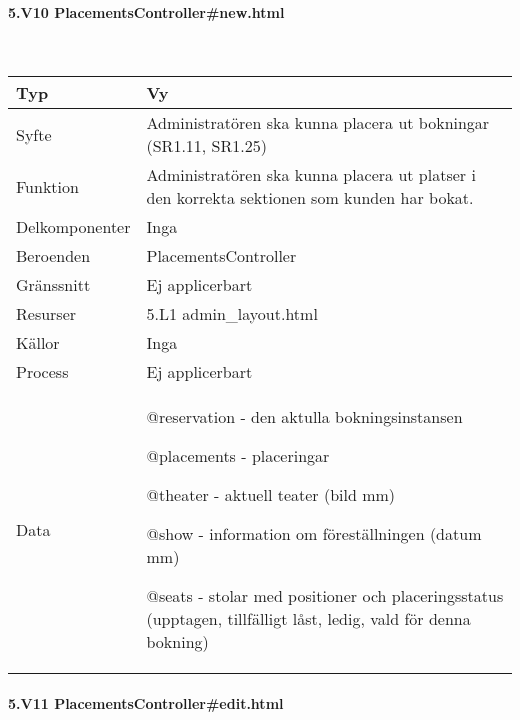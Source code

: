 \documentclass[a4paper, twoside, 11pt, titlepage]{article}
\begin{document}
			\paragraph{5.V10 PlacementsController\#new.html}\

			\begin {table} [ht] \begin{tabular} {  p{3.5cm} p{9.6cm} }
				\hline
				{Typ} & {Vy} \\
				\hline
				{Syfte} & {Administratören ska kunna placera ut bokningar (SR1.11, SR1.25)} \\
				\hline
				{Funktion} & {Administratören ska kunna placera ut platser i den korrekta sektionen som kunden har bokat.} \\
				\hline
				{Delkomponenter} & {Inga} \\
				\hline
				{Beroenden} & {PlacementsController} \\
				\hline
				{Gränssnitt} & {Ej applicerbart} \\
				\hline
				{Resurser} & {5.L1 admin\_layout.html} \\
				\hline
				{Källor} & {Inga} \\
				\hline
				{Process} & {Ej applicerbart} \\
				\hline
				{Data} & {@reservation - den aktulla bokningsinstansen

@placements - placeringar

@theater - aktuell teater (bild mm)

@show - information om föreställningen (datum mm)

@seats - stolar med positioner och placeringsstatus (upptagen, tillfälligt låst, ledig, vald för denna bokning)} \\
				\hline
			\end{tabular} \end{table} \FloatBarrier


			\paragraph{5.V11 PlacementsController\#edit.html}\
\end{document}
